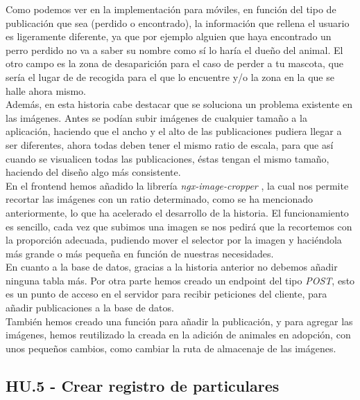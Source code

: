 Como podemos ver en la implementación para móviles, en función del tipo de publicación que sea (perdido o encontrado), la información que rellena el usuario es ligeramente diferente, ya que por ejemplo alguien que haya encontrado un perro perdido no va a saber su nombre como sí lo haría el dueño del animal. El otro campo es la zona de desaparición para el caso de perder a tu mascota, que sería el lugar de de recogida para el que lo encuentre y/o la zona en la que se halle ahora mismo. \\

Además, en esta historia cabe destacar que se soluciona un problema existente en las imágenes. Antes se podían subir imágenes de cualquier tamaño a la aplicación, haciendo que el ancho y el alto de las publicaciones pudiera llegar a ser diferentes, ahora todas deben tener el mismo ratio de escala, para que así cuando se visualicen todas las publicaciones, éstas tengan el mismo tamaño, haciendo del diseño algo más consistente.\\

En el frontend hemos añadido la librería \textit{ngx-image-cropper} \cite{cropper}, la cual nos permite recortar las imágenes con un ratio determinado, como se ha mencionado anteriormente, lo que ha acelerado el desarrollo de la historia. El funcionamiento es sencillo, cada vez que subimos una imagen se nos pedirá que la recortemos con la proporción adecuada, pudiendo mover el selector por la imagen y haciéndola más grande o más pequeña en función de nuestras necesidades. \\

En cuanto a la base de datos, gracias a la historia anterior no debemos añadir ninguna tabla más. Por otra parte hemos creado un endpoint del tipo \textit{POST}, esto es un punto de acceso en el servidor para recibir peticiones del cliente, para añadir publicaciones a la base de datos. \\

También hemos creado una función para añadir la publicación, y para agregar las imágenes, hemos reutilizado la creada en la adición de animales en adopción, con unos pequeños cambios, como cambiar la ruta de almacenaje de las imágenes. \\ 




\subsection{HU.5 - Crear registro de particulares}

